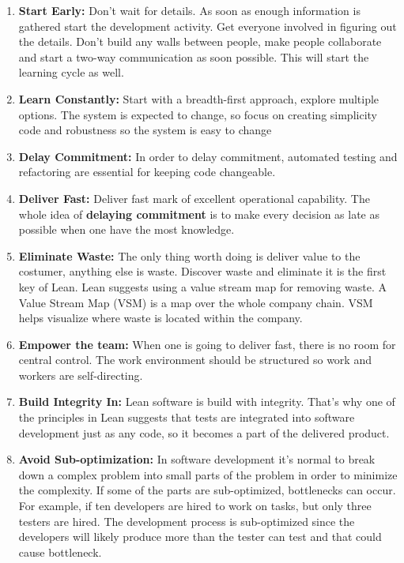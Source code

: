 \documentclass[UKenglish]{ifimaster}  %
\begin{document}
\begin{enumerate}
\item \textbf{Start Early:}  Don't wait for details. As soon as enough information is gathered start the development activity. Get everyone involved in figuring out the details. Don't build any walls between people, make people collaborate and start a two-way communication as soon possible. This will start the learning cycle as well.

\item \textbf{Learn Constantly:} Start with a breadth-first approach, explore multiple options. The system is expected to change, so focus on creating simplicity code and robustness so the system is easy to change

\item \textbf{Delay Commitment:} 
In order to delay commitment, automated testing and refactoring are essential for keeping code changeable. 

\item \textbf{Deliver Fast:}
Deliver fast mark of excellent operational capability. The whole idea of \textbf{delaying commitment} is to make every decision as late as possible when one have the most knowledge.
\item \textbf{Eliminate Waste:}
The only thing worth doing is deliver value to the costumer, anything else is waste.  Discover waste and eliminate it is the first key of Lean.  Lean suggests using a value stream map for removing waste. A Value Stream Map (VSM) is a map over the whole company chain. VSM helps visualize where waste is located within the company.
\item \textbf{Empower the team:} When one is going to deliver fast, there is no room for central control. The work environment should be structured so work and workers are self-directing.

\item \textbf{Build Integrity In:} Lean software is build with integrity. That's why one of the principles in Lean suggests that tests are integrated into software development just as any code, so it becomes a part of the delivered product. 

\item \textbf{Avoid Sub-optimization:} In software development it's normal to break down a complex problem into small parts of the problem in order to minimize the complexity.  If some of the parts are sub-optimized, bottlenecks can occur. For example, if ten developers are hired to work on tasks, but only three testers are hired. The development process is sub-optimized since the developers will likely produce more than the tester can test and that could cause bottleneck.
\end{enumerate}
\end{document}
